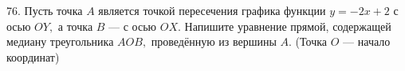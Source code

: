 76. Пусть точка $A$ является точкой пересечения графика функции $y=-2x+2$ с осью $OY,$ а точка $B$ --- с осью $OX.$ Напишите уравнение прямой, содержащей медиану треугольника $AOB,$ проведённую из вершины $A.$ (Точка $O$ --- начало координат)\\
